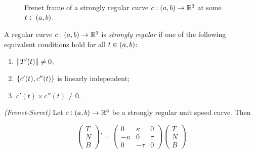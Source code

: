 \begin{figure}[h!tb]
	\centering
	\caption{Frenet frame of a strongly regular curve $c: \intoo{a,b} \to \mathbb{R}^3$ at some $t \in \intoo{a,b}$.}
\end{figure}


\vspace{1mm}

\begin{definition}
	A regular curve $c: \intoo{a,b} \to \mathbb{R}^3$ is \emph{strongly regular} if one of the following equivalent conditions hold for all $t \in \intoo{a,b}$:

	\begin{enumerate}[label = (\roman*)]
		\item $\norm[0]{T'(t)} \neq 0$;
		\item $\cbr[0]{c'(t),c''(t)}$ is linearly independent;
		\item $c'(t) \times c''(t) \neq 0$.
	\end{enumerate}
\end{definition}

\vspace{1mm}

\begin{theorem}\emph{(Frenet-Serret)}
	Let $c: \intoo{a,b} \to \mathbb{R}^3$ be a strongly regular unit speed curve. Then

	\begin{equation}
		\begin{pmatrix}
			T\\
			N\\
			B
		\end{pmatrix}' = \begin{pmatrix}
			0 & \kappa & 0\\
			-\kappa & 0 & \tau\\
			0 & -\tau & 0
		\end{pmatrix}\begin{pmatrix}
			T\\
			N\\
			B
		\end{pmatrix}
	\end{equation}
\end{theorem}

